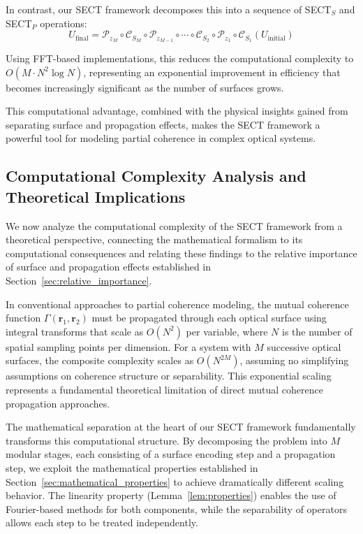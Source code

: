 \documentclass[a4paper,12pt]{article}
\begin{document}
In contrast, our SECT framework decomposes this into a sequence of SECT$_S$ and SECT$_P$ operations:
\begin{equation}
U_{\text{final}} = \mathcal{P}_{z_M} \circ \mathcal{C}_{S_M} \circ \mathcal{P}_{z_{M-1}} \circ \cdots \circ \mathcal{C}_{S_2} \circ \mathcal{P}_{z_1} \circ \mathcal{C}_{S_1}(U_{\text{initial}})
\end{equation}

Using FFT-based implementations, this reduces the computational complexity to $O(M \cdot N^2 \log N)$, representing an exponential improvement in efficiency that becomes increasingly significant as the number of surfaces grows.

This computational advantage, combined with the physical insights gained from separating surface and propagation effects, makes the SECT framework a powerful tool for modeling partial coherence in complex optical systems.

\subsection{Computational Complexity Analysis and Theoretical Implications}

We now analyze the computational complexity of the SECT framework from a theoretical perspective, connecting 
the mathematical formalism to its computational consequences and relating these findings to the relative 
importance of surface and propagation effects established in Section~\ref{sec:relative_importance}.

In conventional approaches to partial coherence modeling, the mutual coherence function $\Gamma(\bm{r}_1, \bm{r}_2)$ must 
be propagated through each optical surface using integral transforms that scale as $O(N^2)$ per variable, where $N$ is 
the number of spatial sampling points per dimension. For a system with $M$ successive optical surfaces, the composite 
complexity scales as $O(N^{2M})$, assuming no simplifying assumptions on coherence structure or separability. 
This exponential scaling represents a fundamental theoretical limitation of direct mutual coherence propagation 
approaches.

The mathematical separation at the heart of our SECT framework fundamentally transforms this computational structure. By decomposing the problem into $M$ modular stages, each consisting of a surface encoding step and a propagation step, we exploit the mathematical properties established in Section~\ref{sec:mathematical_properties} to achieve dramatically different scaling behavior. The linearity property (Lemma~\ref{lem:properties}) enables the use of Fourier-based methods for both components, while the separability of operators allows each step to be treated independently.
\end{document}
